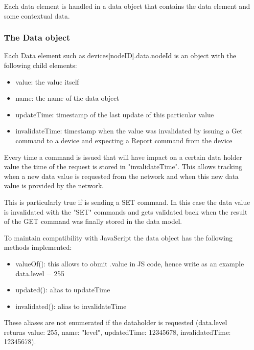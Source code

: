 Each data element is handled in a data object that contains the data element and some contextual data.

\subsubsection{The Data object}

Each Data element such as devices[nodeID].data.nodeId is an object with the following child elements:
\begin{itemize}
\item value: the value itself
\item name: the name of the data object
\item updateTime: timestamp of the last update of this particular value
\item invalidateTime: timestamp when the value was invalidated by issuing a Get 
command to a device and expecting a Report command from the device
\end{itemize}

Every time a command is issued that will have impact on a certain data holder value the 
time of the request is stored in "invalidateTime".
This allows tracking when a new data value is requested from the network and when this 
new data value is provided by the network.

This is particularly true if \zway is sending a SET command. In this case the data value 
is invalidated with the "SET" commands and gets validated back when the result of the GET 
command was finally stored in the data model.

To maintain compatibility with JavaScript the data object has the following methods implemented:

\begin{itemize}
\item valueOf(): this allows to obmit .value in JS code, hence write as an example data.level = 255
\item updated(): alias to updateTime
\item invalidated(): alias to invalidateTime
\end{itemize}

These aliases are not enumerated if the dataholder is requested (data.level returns 
{value: 255, name: "level", updatedTime: 12345678, invalidatedTime: 12345678}).

